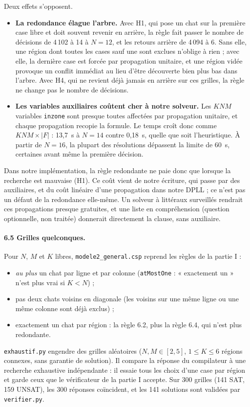 \documentclass[11pt,a4paper]{article}
\newcommand{\code}[1]{\texttt{#1}}
\begin{document}
Deux effets s'opposent.
\begin{itemize}
  \item \textbf{La redondance élague l'arbre.} Avec H1, qui pose un chat sur la première case
        libre et doit souvent revenir en arrière, la règle fait passer le nombre de décisions
        de 4\,102 à 14 à $N = 12$, et les retours arrière de 4\,094 à 6. Sans elle, une région
        dont toutes les cases sauf une sont exclues n'oblige à rien ; avec elle, la dernière
        case est forcée par propagation unitaire, et une région vidée provoque un conflit
        immédiat au lieu d'être découverte bien plus bas dans l'arbre. Avec H4, qui ne
        revient déjà jamais en arrière sur ces grilles, la règle ne change pas le nombre de
        décisions.
  \item \textbf{Les variables auxiliaires coûtent cher à notre solveur.} Les $K N M$
        variables \code{inzone} sont presque toutes affectées par propagation unitaire, et
        chaque propagation recopie la formule. Le temps croît donc comme
        $K N M \times |F|$ : 13,7~s à $N = 14$ contre 0,18~s, quelle que soit l'heuristique.
        À partir de $N = 16$, la plupart des résolutions dépassent la limite de 60~s,
        certaines avant même la première décision.
\end{itemize}
Dans notre implémentation, la règle redondante ne paie donc que lorsque la recherche est
mauvaise (H1). Ce coût vient de notre écriture, qui passe par des auxiliaires, et du coût
linéaire d'une propagation dans notre DPLL ; ce n'est pas un défaut de la redondance
elle-même. Un solveur à littéraux surveillés rendrait ces propagations presque gratuites, et
une liste en compréhension (question optionnelle, non traitée) donnerait directement la
clause, sans auxiliaire.

\paragraph{6.5 Grilles quelconques.} Pour $N$, $M$ et $K$ libres, \code{modele2\_general.csp}
reprend les règles de la partie I :
\begin{itemize}
  \item \emph{au plus} un chat par ligne et par colonne (\code{atMostOne} : « exactement
        un » n'est plus vrai si $K < N$) ;
  \item pas deux chats voisins en diagonale (les voisins sur une même ligne ou une même
        colonne sont déjà exclus) ;
  \item exactement un chat par région : la règle 6.2, plus la règle 6.4, qui n'est plus
        redondante.
\end{itemize}
\code{exhaustif.py} engendre des grilles aléatoires ($N, M \in [2,5]$, $1 \le K \le 6$ régions
connexes, sans garantie de solution). Il compare la réponse du compilateur à une recherche
exhaustive indépendante : il essaie tous les choix d'une case par région et garde ceux que le
vérificateur de la partie I accepte. Sur 300 grilles (141 SAT, 159 UNSAT), les 300 réponses
coïncident, et les 141 solutions sont validées par \code{verifier.py}.
\end{document}
